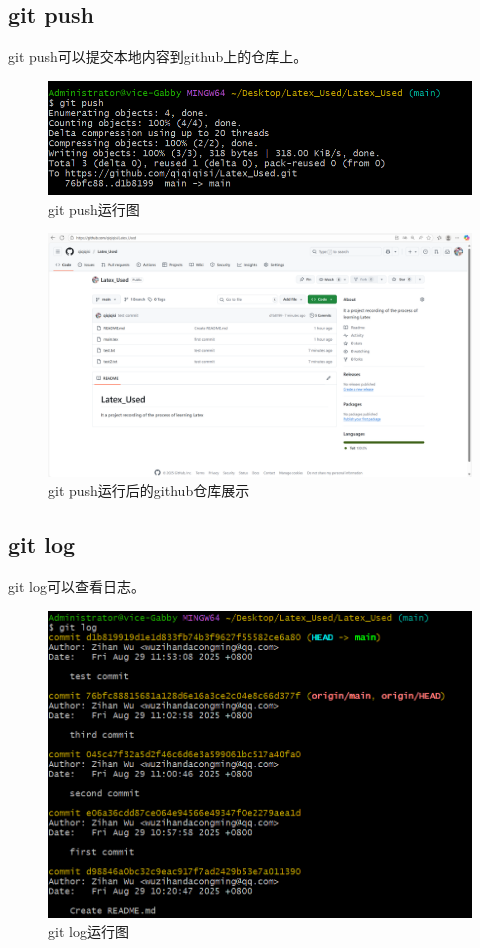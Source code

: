 \documentclass{article}
\begin{document}
\subsection{git push}
git push可以提交本地内容到github上的仓库上。
\begin{figure}[H]
    \centering
    \includegraphics[width=1\linewidth]{git_push.png}
    \caption{git push运行图}
    \label{fig:push}
\end{figure}
\begin{figure}[H]
    \centering
    \includegraphics[width=1\linewidth]{push_result.png}
    \caption{git push运行后的github仓库展示}
    \label{fig:push1}
\end{figure}

\subsection{git log}
git log可以查看日志。
\begin{figure}[H]
    \centering
    \includegraphics[width=1\linewidth]{git_log.png}
    \caption{git log运行图}
    \label{fig:log}
\end{figure}
\end{document}
